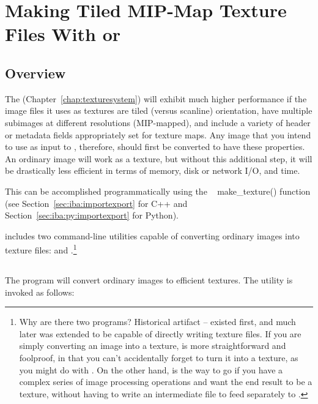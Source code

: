 \chapter{Making Tiled MIP-Map Texture Files With \maketx or \oiiotool}
\label{chap:maketx}

\section{Overview}

The \TextureSystem (Chapter~\ref{chap:texturesystem}) will exhibit much
higher performance if the image files it uses as textures are tiled (versus
scanline) orientation, have multiple subimages at different resolutions
(MIP-mapped), and include a variety of header or metadata fields
appropriately set for texture maps. Any image that you intend to use as
input to \TextureSystem, therefore, should first be converted to have these
properties. An ordinary image will work as a texture, but without this
additional step, it will be drastically less efficient in terms of memory,
disk or network I/O, and time.

This can be accomplished programmatically using the \ImageBufAlgo\ {\cf
make_texture()} function (see Section~\ref{sec:iba:importexport} for C++ and
Section~\ref{sec:iba:py:importexport} for Python).

\product includes two command-line utilities capable of converting
ordinary images into texture files: \maketx and \oiiotool.\footnote{Why
are there two programs? Historical artifact -- \maketx existed first,
and much later \oiiotool was extended to be capable of directly writing
texture files. If you are simply converting an image into
a texture, \maketx is more straightforward and foolproof, in that you
can't accidentally forget to turn it into a texture, as you might do
with \oiiotool. On the other hand, \oiiotool is the way to go if you have
a complex series of image processing operations and want the end result
to be a texture, without having to write an intermediate file to feed
separately to \maketx.}

\section{\maketx}
\label{sec:maketx}

The \maketx program will convert ordinary images to efficient
textures. The \maketx utility is invoked as follows:

